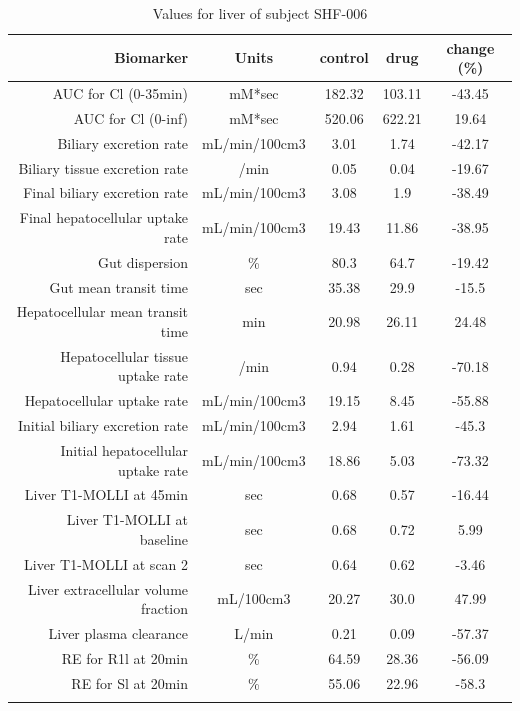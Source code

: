 \documentclass{epflreport}%
\begin{document}
%
\clearpage%
\begin{longtable}{rcccc}%
\hline%
Biomarker&Units&control&drug&change (\%)\\%
\hline%
AUC for Cl (0{-}35min)&mM*sec&182.32&103.11&{-}43.45\\%
AUC for Cl (0{-}inf)&mM*sec&520.06&622.21&19.64\\%
Biliary excretion rate&mL/min/100cm3&3.01&1.74&{-}42.17\\%
Biliary tissue excretion rate&/min&0.05&0.04&{-}19.67\\%
Final biliary excretion rate&mL/min/100cm3&3.08&1.9&{-}38.49\\%
Final hepatocellular uptake rate&mL/min/100cm3&19.43&11.86&{-}38.95\\%
Gut dispersion&\%&80.3&64.7&{-}19.42\\%
Gut mean transit time&sec&35.38&29.9&{-}15.5\\%
Hepatocellular mean transit time&min&20.98&26.11&24.48\\%
Hepatocellular tissue uptake rate&/min&0.94&0.28&{-}70.18\\%
Hepatocellular uptake rate&mL/min/100cm3&19.15&8.45&{-}55.88\\%
Initial biliary excretion rate&mL/min/100cm3&2.94&1.61&{-}45.3\\%
Initial hepatocellular uptake rate&mL/min/100cm3&18.86&5.03&{-}73.32\\%
Liver T1{-}MOLLI at 45min&sec&0.68&0.57&{-}16.44\\%
Liver T1{-}MOLLI at baseline&sec&0.68&0.72&5.99\\%
Liver T1{-}MOLLI at scan 2&sec&0.64&0.62&{-}3.46\\%
Liver extracellular volume fraction&mL/100cm3&20.27&30.0&47.99\\%
Liver plasma clearance&L/min&0.21&0.09&{-}57.37\\%
RE for R1l at 20min&\%&64.59&28.36&{-}56.09\\%
RE for Sl at 20min&\%&55.06&22.96&{-}58.3\\%
\hline%
\caption{Values for liver of subject SHF-006} \\%
\end{longtable}%
\end{document}
